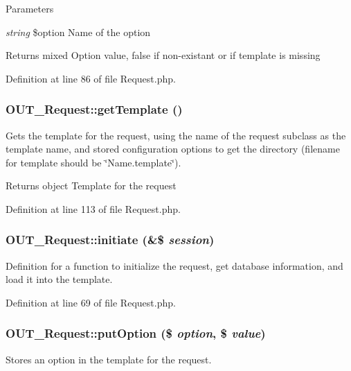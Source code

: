\begin{DoxyParams}{Parameters}
\item[{\em string}]\$option Name of the option\end{DoxyParams}
\begin{DoxyReturn}{Returns}
mixed Option value, false if non-\/existant or if template is missing 
\end{DoxyReturn}


Definition at line 86 of file Request.php.\hypertarget{classOUT__Request_a2b3032d9a81143c98702d8b9344e6ba2}{
\subsubsection[{getTemplate}]{\setlength{\rightskip}{0pt plus 5cm}OUT\_\-Request::getTemplate ()}}
\label{de/d53/classOUT__Request_a2b3032d9a81143c98702d8b9344e6ba2}
Gets the template for the request, using the name of the request subclass as the template name, and stored configuration options to get the directory (filename for template should be \char`\"{}Name.template\char`\"{}).

\begin{DoxyReturn}{Returns}
object Template for the request 
\end{DoxyReturn}


Definition at line 113 of file Request.php.\hypertarget{classOUT__Request_a825f77601714b2cb7510ab65d2d71483}{
\subsubsection[{initiate}]{\setlength{\rightskip}{0pt plus 5cm}OUT\_\-Request::initiate (\&\$ {\em session})}}
\label{de/d53/classOUT__Request_a825f77601714b2cb7510ab65d2d71483}
Definition for a function to initialize the request, get database information, and load it into the template. 

Definition at line 69 of file Request.php.\hypertarget{classOUT__Request_ad1b829ea37ed35c67115e0886089d92d}{
\subsubsection[{putOption}]{\setlength{\rightskip}{0pt plus 5cm}OUT\_\-Request::putOption (\$ {\em option}, \/  \$ {\em value})}}
\label{de/d53/classOUT__Request_ad1b829ea37ed35c67115e0886089d92d}
Stores an option in the template for the request.


